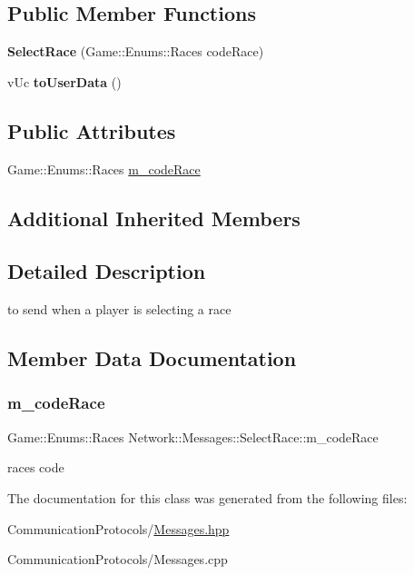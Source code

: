 \subsection*{Public Member Functions}
\begin{DoxyCompactItemize}
\item 
\mbox{\label{class_network_1_1_messages_1_1_select_race_a2fa45cac1365c95a11f47dcb8f35c137}} 
{\bfseries Select\+Race} (Game\+::\+Enums\+::\+Races code\+Race)
\item 
\mbox{\label{class_network_1_1_messages_1_1_select_race_a38be002d0f37df74d7c0c976e8a92330}} 
v\+Uc {\bfseries to\+User\+Data} ()
\end{DoxyCompactItemize}
\subsection*{Public Attributes}
\begin{DoxyCompactItemize}
\item 
Game\+::\+Enums\+::\+Races \hyperlink{class_network_1_1_messages_1_1_select_race_a2fa909b6eaec9d8c7991baf6b568fae2}{m\+\_\+code\+Race}
\end{DoxyCompactItemize}
\subsection*{Additional Inherited Members}


\subsection{Detailed Description}
to send when a player is selecting a race 

\subsection{Member Data Documentation}
\mbox{\label{class_network_1_1_messages_1_1_select_race_a2fa909b6eaec9d8c7991baf6b568fae2}} 
\subsubsection{\texorpdfstring{m\+\_\+code\+Race}{m\_codeRace}}
{\footnotesize\ttfamily Game\+::\+Enums\+::\+Races Network\+::\+Messages\+::\+Select\+Race\+::m\+\_\+code\+Race}

race\textquotesingle{}s code 

The documentation for this class was generated from the following files\+:\begin{DoxyCompactItemize}
\item 
Communication\+Protocols/\hyperlink{_messages_8hpp}{Messages.\+hpp}\item 
Communication\+Protocols/Messages.\+cpp\end{DoxyCompactItemize}

